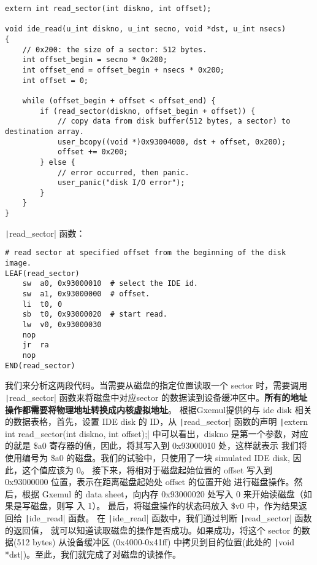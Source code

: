 \begin{verbatim}
extern int read_sector(int diskno, int offset);

void ide_read(u_int diskno, u_int secno, void *dst, u_int nsecs)
{
    // 0x200: the size of a sector: 512 bytes.
    int offset_begin = secno * 0x200;
    int offset_end = offset_begin + nsecs * 0x200;
    int offset = 0;

    while (offset_begin + offset < offset_end) {
        if (read_sector(diskno, offset_begin + offset)) {
            // copy data from disk buffer(512 bytes, a sector) to destination array.
            user_bcopy((void *)0x93004000, dst + offset, 0x200);
            offset += 0x200;
        } else {
            // error occurred, then panic.
            user_panic("disk I/O error");
        }
    }
}
\end{verbatim}

\texttt|read_sector| 函数：

\begin{verbatim}
# read sector at specified offset from the beginning of the disk image.
LEAF(read_sector)
    sw  a0, 0x93000010  # select the IDE id.
    sw  a1, 0x93000000  # offset.
    li  t0, 0
    sb  t0, 0x93000020  # start read.
    lw  v0, 0x93000030
    nop
    jr  ra
    nop
END(read_sector)
\end{verbatim}

我们来分析这两段代码。当需要从磁盘的指定位置读取一个 sector 时，需要调用 \texttt|read_sector|
函数来将磁盘中对应sector 的数据读到设备缓冲区中。\textbf{所有的地址操作都需要将物理地址转换成内核虚拟地址}。
根据Gxemul提供的与 ide disk 相关的数据表格，首先，设置 IDE disk 的 ID，从
\texttt|read_sector| 函数的声明 \texttt|extern int read_sector(int diskno, int offset);|
中可以看出，diskno 是第一个参数，对应的就是 \$a0 寄存器的值，因此，将其写入到 0x93000010 处，这样就表示
我们将使用编号为 \$a0 的磁盘。我们的试验中，只使用了一块 simulated IDE disk, 因此，这个值应该为 0。
接下来，将相对于磁盘起始位置的 offset 写入到 0x93000000 位置，表示在距离磁盘起始处 offset 的位置开始
进行磁盘操作。然后，根据 Gxemul 的 data sheet，向内存 0x93000020 处写入 0 来开始读磁盘（如果是写磁盘，则写
入 1）。
最后，将磁盘操作的状态码放入 \$v0 中，作为结果返回给 \texttt|ide_read| 函数。
在 \texttt|ide_read| 函数中，我们通过判断 \texttt|read_sector| 函数的返回值，
就可以知道读取磁盘的操作是否成功。如果成功，将这个 sector 的数据(512 bytes) 从设备缓冲区 (0x4000-0x41ff) 
中拷贝到目的位置(此处的 \texttt|void *dst|)。至此，我们就完成了对磁盘的读操作。

